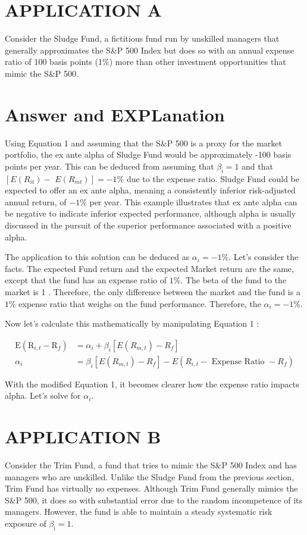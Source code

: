 \documentclass[11pt]{article}
\begin{document}
\section*{APPLICATION A}
Consider the Sludge Fund, a fictitious fund run by unskilled managers that generally approximates the S\&P 500 Index but does so with an annual expense ratio of 100 basis points (1\%) more than other investment opportunities that mimic the S\&P 500.

\section*{Answer and EXPLanation}
Using Equation 1 and assuming that the S\&P 500 is a proxy for the market portfolio, the ex ante alpha of Sludge Fund would be approximately -100 basis points per year. This can be deduced from assuming that $\beta_{\mathrm{i}}=1$ and that $\left[E\left(R_{i t}\right)-\right.$ $\left.E\left(R_{m t}\right)\right]=-1 \%$ due to the expense ratio. Sludge Fund could be expected to offer an ex ante alpha, meaning a consistently inferior risk-adjusted annual return, of $-1 \%$ per year. This example illustrates that ex ante alpha can be negative to indicate inferior expected performance, although alpha is usually discussed in the pursuit of the superior performance associated with a positive alpha.

The application to this solution can be deduced as $\alpha_{i}=-1 \%$. Let's consider the facts. The expected Fund return and the expected Market return are the same, except that the fund has an expense ratio of $1 \%$. The beta of the fund to the market is 1 . Therefore, the only difference between the market and the fund is a $1 \%$ expense ratio that weighs on the fund performance. Therefore, the $\alpha_{i}=-1 \%$.

Now let's calculate this mathematically by manipulating Equation 1 :

$$
\begin{aligned}
\mathrm{E}\left(\mathrm{R}_{i, t}-\mathrm{R}_{f}\right) & =\alpha_{i}+\beta_{i}\left[E\left(R_{m, t}\right)-R_{f}\right] \\
\alpha_{i} & =\beta_{i}\left[E\left(R_{m, t}\right)-R_{f}\right]-E\left(R_{i, t}-\text { Expense Ratio }-R_{f}\right)
\end{aligned}
$$

With the modified Equation 1, it becomes clearer how the expense ratio impacts alpha. Let's solve for $\alpha_{i}$.

\section*{APPLICATION B}
Consider the Trim Fund, a fund that tries to mimic the S\&P 500 Index and has managers who are unskilled. Unlike the Sludge Fund from the previous section, Trim Fund has virtually no expenses. Although Trim Fund generally mimics the S\&P 500, it does so with substantial error due to the random incompetence of its managers. However, the fund is able to maintain a steady systematic risk exposure of $\beta_{\mathrm{i}}=1$.
\end{document}
